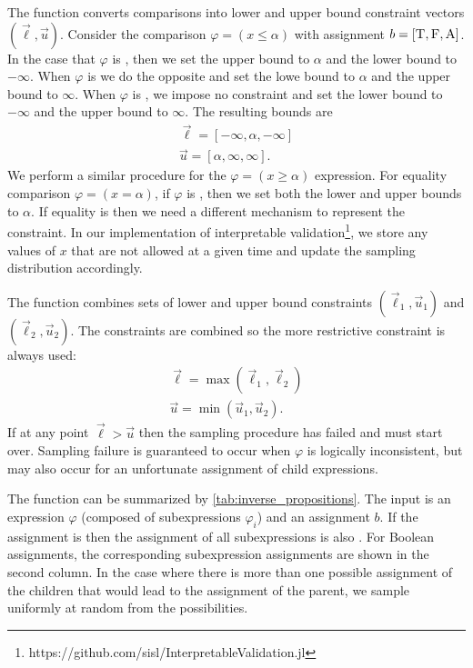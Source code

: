 The function  converts comparisons into lower and upper bound constraint vectors $(\vec{\ell}, \vec{u})$. Consider the comparison $\varphi = (x \leq \alpha)$ with assignment $b = [\textsc{T}, \textsc{F}, \textsc{A}]$. In the case that $\varphi$ is \True{}, then we set the upper bound to $\alpha$ and the lower bound to $-\infty$. When $\varphi$ is \False{} we do the opposite and set the lowe bound to $\alpha$ and the upper bound to $\infty$. When $\varphi$ is \Arbitrary{}, we impose no constraint and set the lower bound to $-\infty$ and the upper bound to $\infty$. The resulting bounds are
\begin{align}
    \vec{\ell} = [-\infty, \alpha, -\infty] \\
    \vec{u} = [\alpha, \infty, \infty] \text{.}
\end{align}
We perform a similar procedure for the $\varphi = (x \geq \alpha)$ expression. For equality comparison $\varphi = (x = \alpha)$, if $\varphi$ is \True{}, then we set both the lower and upper bounds to $\alpha$. If equality is \False{} then we need a different mechanism to represent the constraint. In our implementation of interpretable validation\footnote{https://github.com/sisl/InterpretableValidation.jl}, we store any values of $x$ that are not allowed at a given time and update the sampling distribution accordingly. 

The function  combines sets of lower and upper bound constraints $(\vec{\ell}_1, \vec{u}_1)$ and $(\vec{\ell}_2, \vec{u}_2)$. The constraints are combined so the more restrictive constraint is always used:
\begin{align}
\vec{\ell} = \max(\vec{\ell}_1, \vec{\ell}_2) \\
\vec{u} = \min(\vec{u}_1, \vec{u}_2) \text{.}
\end{align}
If at any point $\vec{\ell} > \vec{u}$ then the sampling procedure has failed and must start over. Sampling failure is guaranteed to occur when $\varphi$ is logically inconsistent, but may also occur for an unfortunate assignment of child expressions. 

The function  can be summarized by \cref{tab:inverse_propositions}. The input is an expression $\varphi$ (composed of subexpressions $\varphi_i$) and an assignment $b$. If the assignment is \Arbitrary{} then the assignment of all subexpressions is also \Arbitrary{}. For Boolean assignments, the corresponding subexpression assignments are shown in the second column. In the case where there is more than one possible assignment of the children that would lead to the assignment of the parent, we sample uniformly at random from the possibilities. 


